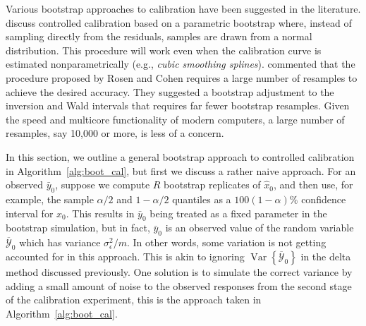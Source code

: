 \documentclass[cmfont,usenames,dvipsnames,leqno]{afit-etd}\usepackage[]{graphicx}\usepackage[]{color}
\newcommand{\mc}[1]{\ensuremath{\mathcal{#1}}}
\newcommand{\wh}[1]{\ensuremath{\widehat{#1}}}
\newcommand{\wb}[1]{\ensuremath{\overline{#1}}}
\newcommand{\var}{\operatorname{Var}}
\begin{document}
Various bootstrap approaches to calibration have been suggested in the literature. \citet{rosen_constructing_1995} discuss controlled calibration based on a parametric bootstrap where, instead of sampling directly from the residuals, samples are drawn from a normal distribution. This procedure will work even when the calibration curve is estimated nonparametrically (e.g., \textit{cubic smoothing splines}). \citet{zeng_bootstrap-adjusted_1997} commented that the procedure proposed by Rosen and Cohen requires a large number of resamples to achieve the desired accuracy. They suggested a bootstrap adjustment to the inversion and Wald intervals that requires far fewer bootstrap resamples. Given the speed and multicore functionality of modern computers, a large number of resamples, say 10,000 or more, is less of a concern. 

In this section, we outline a general bootstrap approach to controlled calibration in Algorithm~\ref{alg:boot_cal}, but first we discuss a rather naive approach. For an observed $\bar{y}_0$, suppose we compute $R$ bootstrap replicates of $\wh{x}_0$, and then use, for example, the sample $\alpha/2$ and $1 - \alpha/2$ quantiles as a $100(1 - \alpha)\%$ confidence interval for $x_0$. This results in $\bar{y}_0$ being treated as a fixed parameter in the bootstrap simulation, but in fact, $\bar{y}_0$ is an observed value of the random variable $\wb{\mc{Y}}_0$ which has variance $\sigma_\epsilon^2/m$. In other words, some variation is not getting accounted for in this approach. This is akin to ignoring $\var\left\{\wb{\mc{Y}}_0\right\}$ in the delta method discussed previously. One solution is to simulate the correct variance by adding a small amount of noise to the observed responses from the second stage of the calibration experiment, this is the approach taken in Algorithm~\ref{alg:boot_cal}.
\end{document}
